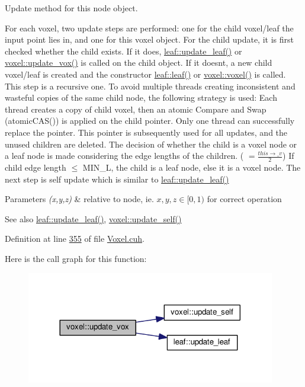 Update method for this node object. 

For each voxel, two update steps are performed\+: one for the child voxel/leaf the input point lies in, and one for this voxel object. For the child update, it is first checked whether the child exists. If it does, \hyperlink{classleaf_a3c205ce57e242832977bde6e1a04d7da}{leaf\+::update\+\_\+leaf()} or \hyperlink{classvoxel_a97737aec7c381e72d929d2f084952683}{voxel\+::update\+\_\+vox()} is called on the child object. If it doesn\textquotesingle{}t, a new child voxel/leaf is created and the constructor \hyperlink{classleaf_adfaf04cd4b50545cbc902d1aa36bc609}{leaf\+::leaf()} or \hyperlink{classvoxel_a1f832fd40f23c4fd721a4144387db6ef}{voxel\+::voxel()} is called. This step is a recursive one. To avoid multiple threads creating inconsistent and wasteful copies of the same child node, the following strategy is used\+: Each thread creates a copy of child voxel, then an atomic Compare and Swap (atomic\+C\+A\+S()) is applied on the child pointer. Only one thread can successfully replace the pointer. This pointer is subsequently used for all updates, and the unused children are deleted. The decision of whether the child is a voxel node or a leaf node is made considering the edge lengths of the children. ( $=\frac{this\to\_v}{2}$) If child edge length $ \leq $ M\+I\+N\+\_\+L, the child is a leaf node, else it is a voxel node. The next step is self update which is similar to \hyperlink{classleaf_a3c205ce57e242832977bde6e1a04d7da}{leaf\+::update\+\_\+leaf()} 
\begin{DoxyParams}{Parameters}
{\em (x,y,z)} & relative to node, ie. $x, y, z \in [0,1)$ for correct operation \\
\hline
\end{DoxyParams}
\begin{DoxySeeAlso}{See also}
\hyperlink{classleaf_a3c205ce57e242832977bde6e1a04d7da}{leaf\+::update\+\_\+leaf()}, \hyperlink{classvoxel_a1748472909af5ef1f28d0a0c6648dbbd}{voxel\+::update\+\_\+self()} 
\end{DoxySeeAlso}


Definition at line \hyperlink{Voxel_8cuh_source_l00355}{355} of file \hyperlink{Voxel_8cuh_source}{Voxel.\+cuh}.



Here is the call graph for this function\+:\nopagebreak
\begin{figure}[H]
\begin{center}
\leavevmode
\includegraphics[width=308pt]{classvoxel_a97737aec7c381e72d929d2f084952683_cgraph}
\end{center}
\end{figure}




